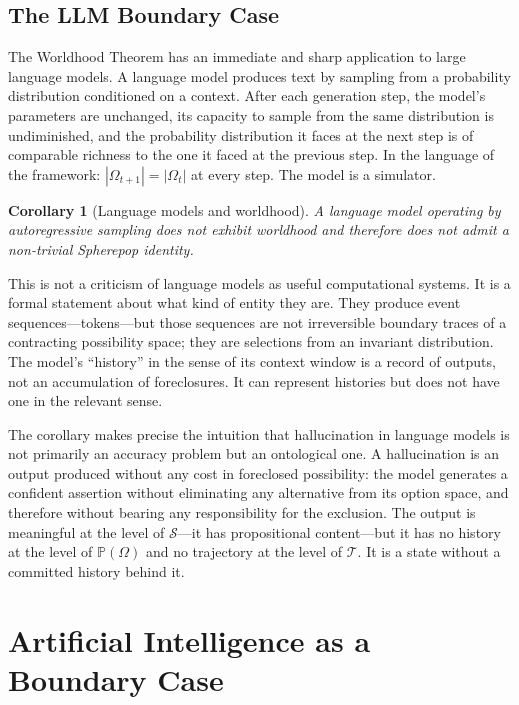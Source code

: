 \documentclass[12pt]{article}
\theoremstyle{plain}
\newtheorem{corollary}[theorem]{Corollary}
\theoremstyle{definition}
\theoremstyle{remark}
\newcommand{\PathCat}{\mathbb{P}(\Omega)}
\begin{document}
\subsection{The LLM Boundary Case}

The Worldhood Theorem has an immediate and sharp application to large language
models.  A language model produces text by sampling from a probability
distribution conditioned on a context.  After each generation step, the model's
parameters are unchanged, its capacity to sample from the same distribution is
undiminished, and the probability distribution it faces at the next step is of
comparable richness to the one it faced at the previous step.  In the language
of the framework: $|\Omega_{t+1}| = |\Omega_t|$ at every step.  The model is
a simulator.

\begin{corollary}[Language models and worldhood]
A language model operating by autoregressive sampling does not exhibit worldhood
and therefore does not admit a non-trivial Spherepop identity.
\end{corollary}

This is not a criticism of language models as useful computational systems.
It is a formal statement about what kind of entity they are.  They produce event
sequences---tokens---but those sequences are not irreversible boundary traces of
a contracting possibility space; they are selections from an invariant
distribution.  The model's ``history'' in the sense of its context window is a
record of outputs, not an accumulation of foreclosures.  It can represent
histories but does not have one in the relevant sense.

The corollary makes precise the intuition that hallucination in language models
is not primarily an accuracy problem but an ontological one.  A hallucination
is an output produced without any cost in foreclosed possibility: the model
generates a confident assertion without eliminating any alternative from its
option space, and therefore without bearing any responsibility for the exclusion.
The output is meaningful at the level of $\mathcal{S}$---it has propositional
content---but it has no history at the level of $\PathCat$ and no trajectory at
the level of $\mathcal{T}$.  It is a state without a committed history behind it.
\section{Artificial Intelligence as a Boundary Case}
\label{sec:ai}
\end{document}
